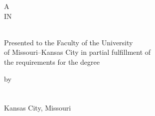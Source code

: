 \begin{center}
\thispagestyle{empty} %

\setlength{\baselineskip}{28pt}
\vspace*{.6in}

\Large{
  \MakeUppercase{\MyThesisTitle}
} 
\normalsize

\setlength{\baselineskip}{13pt}
\vspace*{1.25in}

A \MakeUppercase{\ThesisOrDissertation}\\
IN\\
\vspace{0.1in}
\MyField\\
\vspace{0.5in}

Presented to the Faculty of the University\\
of Missouri--Kansas City in partial fulfillment of\\
the requirements for the degree

\vspace{0.5in}
\MakeUppercase{\MyDegree}
\vspace{0.95in}

by\\
\vspace{0.1in}
\MakeUppercase{\MyName} \\
\vspace{0.15in} 
\MyPrevDegree \\

\vspace{1.5in}
Kansas City, Missouri\\
\MyDegreeAwardYear

\end{center}\newpage
